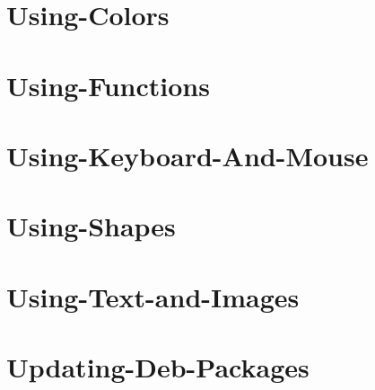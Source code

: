 \let\mypdfximage\pdfximage\def\pdfximage{\immediate\mypdfximage}\documentclass[twoside]{book}
\newcommand{\+}{\discretionary{\mbox{\scriptsize$\hookleftarrow$}}{}{}}
\begin{document}
\chapter{Using-\/\+Colors}
\label{md__home_rvree__t_s_g_l_2_81__t_s_g_l__t_s_g_l_8wiki_tutorials__using-_colors}

\chapter{Using-\/\+Functions}
\label{md__home_rvree__t_s_g_l_2_81__t_s_g_l__t_s_g_l_8wiki_tutorials__using-_functions}

\chapter{Using-\/\+Keyboard-\/\+And-\/\+Mouse}
\label{md__home_rvree__t_s_g_l_2_81__t_s_g_l__t_s_g_l_8wiki_tutorials__using-_keyboard-_and-_mouse}

\chapter{Using-\/\+Shapes}
\label{md__home_rvree__t_s_g_l_2_81__t_s_g_l__t_s_g_l_8wiki_tutorials__using-_shapes}

\chapter{Using-\/\+Text-\/and-\/\+Images}
\label{md__home_rvree__t_s_g_l_2_81__t_s_g_l__t_s_g_l_8wiki_tutorials__using-_text-and-_images}

\chapter{Updating-\/\+Deb-\/\+Packages}
\label{md__home_rvree__t_s_g_l_2_81__t_s_g_l__t_s_g_l_8wiki__updating-_deb-_packages}

\end{document}

